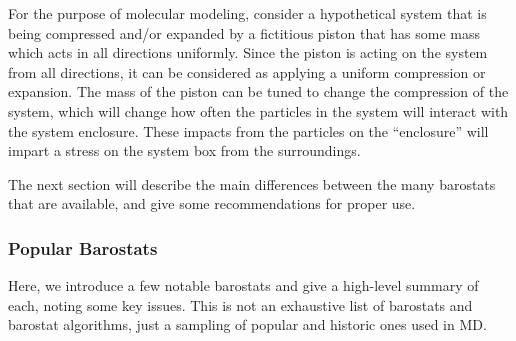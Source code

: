 \documentclass[9pt,bestpractices]{livecoms}
\begin{document}
For the purpose of molecular modeling, consider a hypothetical system that is being compressed and/or expanded by a fictitious piston that has some mass which acts in all directions uniformly.
Since the piston is acting on the system from all directions, it can be considered as applying a uniform compression or expansion.
The mass of the piston can be tuned to change the compression of the system, which will change how often the particles in the system will interact with the system enclosure.
These impacts from the particles on the ``enclosure'' will impart a stress on the system box from the surroundings.


The next section will describe the main differences between the many barostats that are available, and give some recommendations for proper use.

\subsubsection{Popular Barostats}
Here, we introduce a few notable barostats and give a high-level summary of each, noting some key issues.
This is not an exhaustive list of barostats and barostat algorithms, just a sampling of popular and historic ones used in MD\@.
\end{document}
